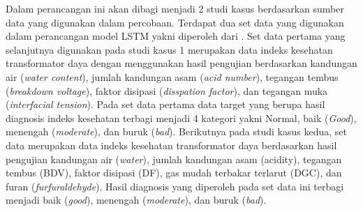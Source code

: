 Dalam perancangan ini akan dibagi menjadi 2 studi kasus berdasarkan sumber data yang digunakan dalam percobaan. Terdapat dua set data yang digunakan dalam perancangan model LSTM yakni diperoleh dari \cite{abdillah2020prognostics, shah2016predict, abu2012calculation}. Set data pertama yang selanjutnya digunakan pada studi kasus 1 merupakan data indeks kesehatan transformator daya dengan menggunakan hasil pengujian berdasarkan kandungan air (\textit{water content}), jumlah kandungan asam (\textit{acid number}), tegangan tembus (\textit{breakdown voltage}), faktor disipasi (\textit{disspation factor}), dan tegangan muka (\textit{interfacial tension}). Pada set data pertama data target yang berupa hasil diagnosis indeks kesehatan terbagi menjadi 4 kategori yakni Normal, baik (\textit{Good}), menengah (\textit{moderate}), dan buruk (\textit{bad}).
Berikutnya pada studi kasus kedua, set data merupakan data indeks kesehatan transformator daya berdasarkan hasil pengujian kandungan air (\textit{water}), jumlah kandungan asam (acidity), tegangan tembus (BDV), faktor disipasi (DF), gas mudah terbakar terlarut (DGC), dan furan (\textit{furfuraldehyde}). Hasil diagnosis yang diperoleh pada set data ini terbagi menjadi baik (\textit{good}), menengah (\textit{moderate}), dan buruk (\textit{bad}).




